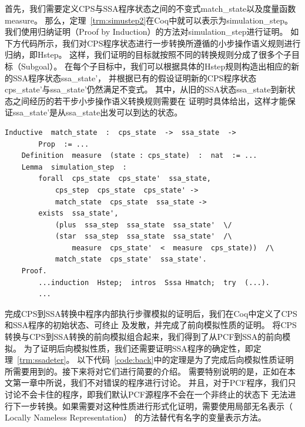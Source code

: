 首先，我们需要定义CPS与SSA程序状态之间的不变式match\_state以及度量函数measure。
那么，定理~\ref{trm:simustep2}在Coq中就可以表示为simulation\_step。
我们使用归纳证明（Proof by Induction）的方法对simulation\_step进行证明。
如下方代码所示，我们对CPS程序状态进行一步转换所遵循的小步操作语义规则进行归纳，即Hstep。
这样，我们证明的目标就按照不同的转换规则分成了很多个子目标（Subgoal）。
在每个子目标中，我们可以根据具体的Hstep规则构造出相应的新的SSA程序状态ssa\_state'，
并根据已有的假设证明新的CPS程序状态cps\_state'与ssa\_state'仍然满足不变式。
其中，从旧的SSA状态ssa\_state到新状态之间经历的若干步小步操作语义转换规则需要在
证明时具体给出，这样才能保证ssa\_state'是从ssa\_state出发可以到达的状态。

\begin{lstlisting}[language=Coq, caption=Coq中CPS到SSA程序内部执行步骤模拟的证明, label=code:cpsssav]  
    Inductive  match_state  :  cps_state  ->  ssa_state  ->  
        Prop  := ...
    Definition  measure  (state : cps_state)  :  nat  := ...
    Lemma  simulation_step  :
        forall  cps_state  cps_state'  ssa_state,
            cps_step  cps_state  cps_state' ->
            match_state  cps_state  ssa_state ->
        exists  ssa_state',  
            (plus  ssa_step  ssa_state  ssa_state'  \/
            (star  ssa_step  ssa_state  ssa_state'  /\  
                measure  cps_state'  <  measure  cps_state))  /\
            match_state  cps_state'  ssa_state'.          
    Proof.
        ...induction  Hstep;  intros  Sssa Hmatch;  try  (...).
        ...
\end{lstlisting}

完成CPS到SSA转换中程序内部执行步骤模拟的证明后，我们在Coq中定义了CPS和SSA程序的初始状态、可终止
及发散，并完成了前向模拟性质的证明。
将CPS转换与CPS到SSA转换的前向模拟组合起来，我们得到了从PCF到SSA的前向模拟。
为了证明后向模拟性质，我们还需要证明SSA程序的确定性，即定理~\ref{trm:ssadeter}。
以下代码~\ref{code:back}中的定理是为了完成后向模拟性质证明所需要用到的。接下来将对它们进行简要的介绍。
需要特别说明的是，正如在本文第一章中所说，我们不对错误的程序进行讨论。
并且，对于PCF程序，我们只讨论不会卡住的程序，即我们默认PCF源程序不会在一个非终止的状态下
无法进行下一步转换。如果需要对这种性质进行形式化证明，需要使用局部无名表示（ Locally Nameless Representation）
的方法替代有名字的变量表示方法。

